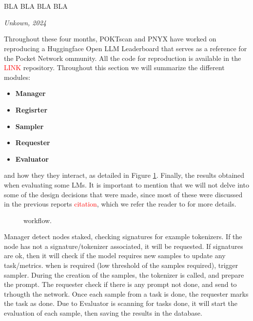 \section{}\label{sec:b}
\epigraph{BLA BLA BLA BLA}{\textit{Unkown, 2024}}


Throughout these four months, POKTscan and PNYX have worked on reproducing a Huggingface Open LLM Leaderboard that serves as a reference for the Pocket Network ommunity. 
All the code for reproduction is available in the \textcolor{red}{LINK} repository. 
Throughout this section we will summarize the different modules:

\begin{itemize}[noitemsep]
    \item \textbf{Manager}
    \item \textbf{Regisrter}
    \item \textbf{Sampler}
    \item \textbf{Requester}
    \item \textbf{Evaluator}
\end{itemize}

and how they they interact, as detailed in Figure \ref{fig:workflow}. 
Finally, the results obtained when evaluating some \glspl{LM}. 
It is important to mention that we will not delve into some of the design decisions that were made, since most of these were discussed in the previous reports \textcolor{red}{citation}, which we refer the reader to for more details.

\begin{figure}[ht]
    \centering
    \caption{ workflow.}
    \label{fig:workflow}
\end{figure}

Manager detect nodes staked, checking signatures for example tokenizers. If the node has not a signature/tokenizer associated, it will be requested. 
If signatures are ok, then it will check if the model requires new samples to update any task/metrics. 
when is required (low threshold of the samples required), trigger sampler. 
During the creation of the samples, the tokenizer is called, and prepare the prompt. 
The requester check if there is any prompt not done, and send to trhougth the network. 
Once each sample from a task is done, the requester marks the task as done. 
Due to Evaluator is scanning for tasks done, it will start the evaluation of each sample, then saving the results in the database. 


